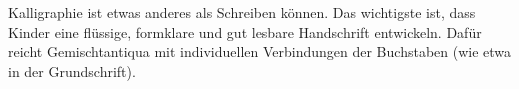 Kalligraphie ist etwas anderes als Schreiben können.
Das wichtigste ist, dass Kinder eine flüssige, formklare und gut lesbare Handschrift entwickeln.
Dafür reicht Gemischtantiqua mit individuellen Verbindungen der Buchstaben (wie etwa in der Grundschrift).
